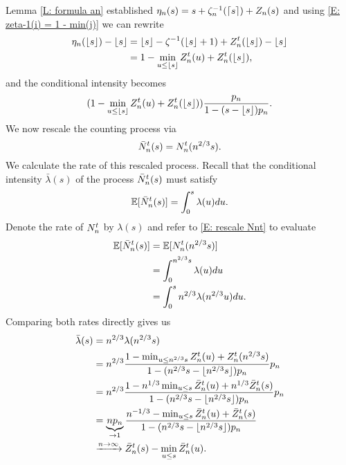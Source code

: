 Lemma \ref{L: formula an} established $\eta_n(s) = s + \zeta^{-1}_n(\lceil s\rceil) + Z_n(s)$ 
and using \eqref{E: zeta-1(i) = 1 - min(j)} we can rewrite
\begin{equation*}
\begin{aligned}
\eta_n(\lfloor s\rfloor) - \lfloor s\rfloor 
&= \lfloor s\rfloor - \zeta^{-1}(\lfloor s\rfloor+1) + Z_n^t(\lfloor s\rfloor) - \lfloor s\rfloor \\
&= 1 - \min_{u \leq \lfloor s\rfloor} Z_n^t(u) + Z_n^t(\lfloor s\rfloor),
\end{aligned}
\end{equation*}
and the conditional intensity becomes
\begin{equation} \label{E: rate Nnt 2}
(1 - \min_{u \leq \lfloor s\rfloor} Z_n^t(u) + Z_n^t(\lfloor s\rfloor)) \frac{p_n}{1-(s-\lfloor s\rfloor)p_n}.
\end{equation}
We now rescale the counting process via
\begin{equation} \label{E: rescale Nnt}
\bar{N}_n^t(s) = N_n^t(n^{2 / 3}s).
\end{equation}
We calculate the rate of this rescaled process.
Recall that the conditional intensity $\bar{\lambda}(s)$ of the process $\bar{N}_n^t(s)$ must satisfy
\begin{equation}
\mathbb{E}[\bar{N}_n^t(s)] = \int_{0}^{s} \lambda(u) du.
\end{equation}
Denote the rate of $N_n^t$ by $\lambda(s)$ and refer to \eqref{E: rescale Nnt} to evaluate
\begin{equation*}
\begin{aligned}
\mathbb{E}[\bar{N}_n^t(s)]
&= \mathbb{E}[N_n^t(n^{2 / 3}s)] \\
&= \int_{0}^{n^{2 / 3}s} \lambda(u) du \\
&= \int_{0}^{s} n^{2 / 3} \lambda(n^{2 / 3}u) du.
\end{aligned}
\end{equation*}
Comparing both rates directly gives us
\begin{equation*}
\begin{aligned}
\bar{\lambda}(s)
&= n^{2 / 3} \lambda(n^{2 / 3}s) \\
&= n^{2 / 3} \frac{1 - \min_{u \leq n^{2 / 3}s} Z_n^t(u) + Z_n^t(n^{2 / 3}s)}{1 - (n^{2 / 3}s - \lfloor n^{2 / 3}s\rfloor)p_n} p_n \\
&= n^{2 / 3} \frac{1 - n^{1 / 3} \min_{u \leq s} \bar{Z}^t_n(u) + n^{1 / 3}\bar{Z}^t_n(s)}{1 - (n^{2 / 3}s - \lfloor n^{2 / 3}s\rfloor)p_n} p_n \\
&= \underbrace{n p_n}_{\rightarrow 1} \frac{n^{-1 / 3} - \min_{u \leq s} \bar{Z}^t_n(u) + \bar{Z}^t_n(s)}{1 - (n^{2 / 3}s - \lfloor n^{2 / 3}s\rfloor)p_n} \\
&\xrightarrow{n \rightarrow \infty} \bar{Z}^t_n(s) - \min_{u \leq s}\bar{Z}^t_n(u).
\end{aligned}
\end{equation*}

